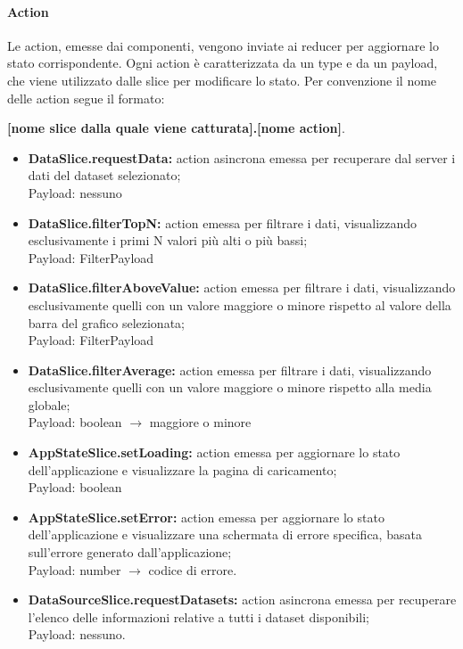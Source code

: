 \paragraph{Action}
    Le action, emesse dai componenti, vengono inviate ai reducer per aggiornare lo stato corrispondente.
    Ogni action è caratterizzata da un type e da un payload, che viene utilizzato dalle slice per modificare lo stato.
    Per convenzione il nome delle action segue il formato: \\
    \begin{center}
        \textbf{[nome slice dalla quale viene catturata].[nome action]}.
    \end{center}
    \begin{itemize}
        \item \textbf{DataSlice.requestData:} action asincrona emessa per recuperare dal server i dati del dataset selezionato; \\ Payload: nessuno
        \item \textbf{DataSlice.filterTopN:} action emessa per filtrare i dati, visualizzando esclusivamente i primi N valori più alti o più bassi; \\ Payload: FilterPayload
        \item \textbf{DataSlice.filterAboveValue:} action emessa per filtrare i dati, visualizzando esclusivamente quelli con un valore maggiore o minore rispetto al valore della barra del grafico selezionata;\\ Payload: FilterPayload
        \item \textbf{DataSlice.filterAverage:} action emessa per filtrare i dati, visualizzando esclusivamente quelli con un valore maggiore o minore rispetto alla media globale; \\ Payload: boolean $\rightarrow$ maggiore o minore
        \item \textbf{AppStateSlice.setLoading:} action emessa per aggiornare lo stato dell'applicazione e visualizzare la pagina di caricamento; \\ Payload: boolean
        \item \textbf{AppStateSlice.setError:} action emessa per aggiornare lo stato dell'applicazione e visualizzare una schermata di errore specifica, basata sull'errore generato dall'applicazione; \\ Payload: number $\rightarrow$ codice di errore.
        \item \textbf{DataSourceSlice.requestDatasets:} action asincrona emessa per recuperare l'elenco delle informazioni relative a tutti i dataset disponibili; \\ Payload: nessuno.

\end{itemize}

